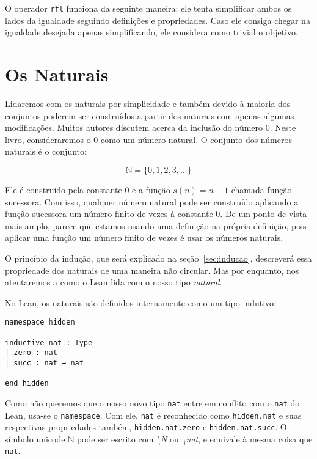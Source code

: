 O operador \lstinline{rfl} funciona da seguinte maneira: ele tenta simplificar ambos os lados da igualdade seguindo definições e propriedades. Caso ele consiga chegar na igualdade desejada apenas simplificando, ele considera como trivial o objetivo.

\section{Os Naturais}
\label{sec:naturais}

Lidaremos com os naturais por simplicidade e também devido à maioria dos conjuntos poderem ser construídos a partir dos naturais com apenas algumas modificações. Muitos autores discutem acerca da inclusão do número $0$. Neste livro, consideraremos o $0$ como um número natural. O conjunto dos números naturais é o conjunto:

\[ \mathbb{N} = \{0,1,2,3,...\}\]

Ele é construído pela constante $0$ e a função $s(n)=n+1$ chamada função sucessora. Com isso, qualquer número natural pode ser construído aplicando a função sucessora um número finito de vezes à constante $0$. De um ponto de vista mais amplo, parece que estamos usando uma definição na própria definição, pois aplicar uma função um número finito de vezes é usar os números naturais. 

O princípio da indução, que será explicado na seção~\ref{sec:inducao}, descreverá essa propriedade dos naturais de uma maneira não circular. Mas por enquanto, nos atentaremos a como o Lean lida com o nosso tipo \textit{natural}.

No Lean, os naturais são definidos internamente como um tipo indutivo:

\begin{lstlisting}
namespace hidden

inductive nat : Type
| zero : nat
| succ : nat → nat

end hidden
\end{lstlisting}

Como não queremos que o nosso novo tipo \lstinline{nat} entre em conflito com o \lstinline{nat} do Lean, usa-se o \lstinline{namespace}. Com ele, \lstinline{nat} é reconhecido como \lstinline{hidden.nat} e suas respectivas propriedades também, \lstinline{hidden.nat.zero} e \lstinline{hidden.nat.succ}. O símbolo unicode $\mathbb{N}$ pode ser escrito com \textit{\textbackslash N} ou \textit{\textbackslash nat}, e equivale à mesma coisa que \lstinline{nat}.

